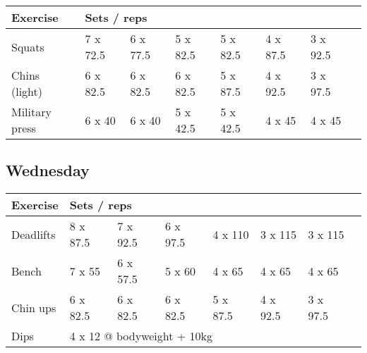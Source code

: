 \documentclass[12pt, a4paper]{article}%
\begin{document}
  \begin{tabular}{l|lllllll}
  \hspace{0.75em} \textbf{Exercise} & \multicolumn{ 7 }{l}{ \textbf{Sets / reps} } \\ \hline

            \hspace{0.75em} Squats
            & 7 x 72.5
            & 6 x 77.5
            & 5 x 82.5
            & 5 x 82.5
            & 4 x 87.5
            & 3 x 92.5
            & 
            \\


            \hspace{0.75em} Chins (light)
            & 6 x 82.5
            & 6 x 82.5
            & 6 x 82.5
            & 5 x 87.5
            & 4 x 92.5
            & 3 x 97.5
            & 
            \\


            \hspace{0.75em} Military press
            & 6 x 40
            & 6 x 40
            & 5 x 42.5
            & 5 x 42.5
            & 4 x 45
            & 4 x 45
            & 
            \\


  \end{tabular}

  \subsection*{\hspace{0.5em} Wednesday }


  \begin{tabular}{l|lllllll}
  \hspace{0.75em} \textbf{Exercise} & \multicolumn{ 7 }{l}{ \textbf{Sets / reps} } \\ \hline

            \hspace{0.75em} Deadlifts
            & 8 x 87.5
            & 7 x 92.5
            & 6 x 97.5
            & 4 x 110
            & 3 x 115
            & 3 x 115
            & 
            \\


            \hspace{0.75em} Bench
            & 7 x 55
            & 6 x 57.5
            & 5 x 60
            & 4 x 65
            & 4 x 65
            & 4 x 65
            & 
            \\


            \hspace{0.75em} Chin ups
            & 6 x 82.5
            & 6 x 82.5
            & 6 x 82.5
            & 5 x 87.5
            & 4 x 92.5
            & 3 x 97.5
            & 
            \\


   \hspace{0.75em} Dips &  \multicolumn{ 7 }{l}{ 4 x 12 @ bodyweight + 10kg } \\
  \end{tabular}
\end{document}
